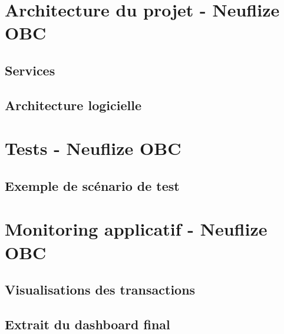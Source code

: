 \documentclass[11pt,twoside]{scrreprt}
\begin{document}
\begin{appendices}

	\chapter{Architecture du projet - Neuflize OBC}
	
		\section{Services}
		\label{a1}
		
	
		\section{Architecture logicielle}
		\label{a2}
		
	
	\chapter{Tests - Neuflize OBC}
		\section{Exemple de scénario de test}
		\label{b1}
		

	\chapter{Monitoring applicatif - Neuflize OBC}
		\section{Visualisations des transactions}
		\label{c1}
		
		\section{Extrait du dashboard final}
		\label{c2}
		
\end{appendices}
\newpage
\newpage
\end{document}

